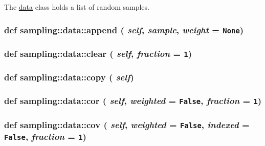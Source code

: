 The \hyperlink{classsampling_1_1data}{data} class holds a list of random samples. 

\hypertarget{classsampling_1_1data_9276fda7f43c819a4bc405dafba8cb90}{
\subsubsection[{append}]{\setlength{\rightskip}{0pt plus 5cm}def sampling::data::append ( {\em self}, \/   {\em sample}, \/   {\em weight} = {\tt None})}}
\label{classsampling_1_1data_9276fda7f43c819a4bc405dafba8cb90}


\hypertarget{classsampling_1_1data_c5d34a6d4c38963e9f61fca1fdfb214f}{
\subsubsection[{clear}]{\setlength{\rightskip}{0pt plus 5cm}def sampling::data::clear ( {\em self}, \/   {\em fraction} = {\tt 1})}}
\label{classsampling_1_1data_c5d34a6d4c38963e9f61fca1fdfb214f}


\hypertarget{classsampling_1_1data_a2b26e86169aedbf74e2f86e24a7b1db}{
\subsubsection[{copy}]{\setlength{\rightskip}{0pt plus 5cm}def sampling::data::copy ( {\em self})}}
\label{classsampling_1_1data_a2b26e86169aedbf74e2f86e24a7b1db}


\hypertarget{classsampling_1_1data_0c7353cefc1e45a887f5341455afc3d8}{
\subsubsection[{cor}]{\setlength{\rightskip}{0pt plus 5cm}def sampling::data::cor ( {\em self}, \/   {\em weighted} = {\tt False}, \/   {\em fraction} = {\tt 1})}}
\label{classsampling_1_1data_0c7353cefc1e45a887f5341455afc3d8}


\hypertarget{classsampling_1_1data_036c155076bf9069de078c8fb8102336}{
\subsubsection[{cov}]{\setlength{\rightskip}{0pt plus 5cm}def sampling::data::cov ( {\em self}, \/   {\em weighted} = {\tt False}, \/   {\em indexed} = {\tt False}, \/   {\em fraction} = {\tt 1})}}
\label{classsampling_1_1data_036c155076bf9069de078c8fb8102336}


